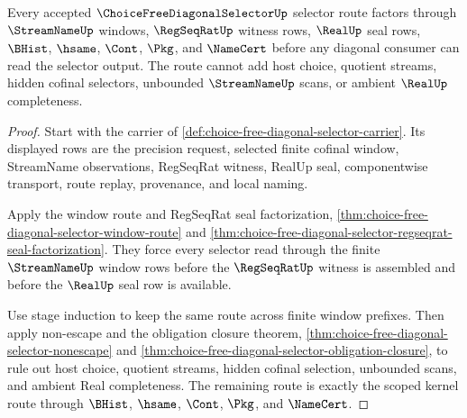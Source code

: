 \begin{theorem}
\label{thm:choice-free-diagonal-selector-scope}
Every accepted $\ChoiceFreeDiagonalSelectorUp$ selector route factors through $\StreamNameUp$ windows, $\RegSeqRatUp$ witness rows, $\RealUp$ seal rows, $\BHist$, $\hsame$, $\Cont$, $\Pkg$, and $\NameCert$ before any diagonal consumer can read the selector output. The route cannot add host choice, quotient streams, hidden cofinal selectors, unbounded $\StreamNameUp$ scans, or ambient $\RealUp$ completeness.
\end{theorem}
\begin{proof}
Start with the carrier of \autoref{def:choice-free-diagonal-selector-carrier}. Its displayed rows are the precision request, selected finite cofinal window, StreamName observations, RegSeqRat witness, RealUp seal, componentwise transport, route replay, provenance, and local naming.

Apply the window route and RegSeqRat seal factorization, \autoref{thm:choice-free-diagonal-selector-window-route} and \autoref{thm:choice-free-diagonal-selector-regseqrat-seal-factorization}. They force every selector read through the finite $\StreamNameUp$ window rows before the $\RegSeqRatUp$ witness is assembled and before the $\RealUp$ seal row is available.

Use stage induction to keep the same route across finite window prefixes. Then apply non-escape and the obligation closure theorem, \autoref{thm:choice-free-diagonal-selector-nonescape} and \autoref{thm:choice-free-diagonal-selector-obligation-closure}, to rule out host choice, quotient streams, hidden cofinal selection, unbounded scans, and ambient Real completeness. The remaining route is exactly the scoped kernel route through $\BHist$, $\hsame$, $\Cont$, $\Pkg$, and $\NameCert$.
\end{proof}

